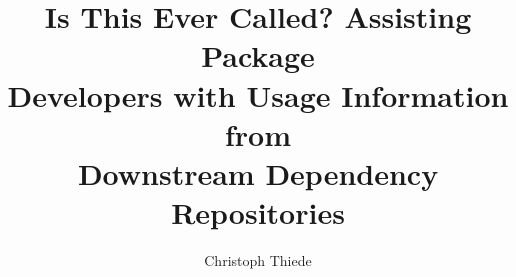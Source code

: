 \title[Downstream Dependency Mining]{Is This Ever Called? Assisting Package \\ Developers with Usage Information from \\ Downstream Dependency Repositories}

\author{Christoph Thiede}

\renewcommand{\shortauthors}{Christoph Thiede}
